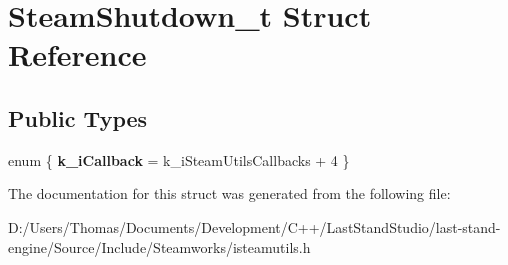 \hypertarget{structSteamShutdown__t}{}\section{Steam\+Shutdown\+\_\+t Struct Reference}
\label{structSteamShutdown__t}
\subsection*{Public Types}
\begin{DoxyCompactItemize}
\item 
\hypertarget{structSteamShutdown__t_abe17dbae8a47c87699f7d44c6ccc0898}{}enum \{ {\bfseries k\+\_\+i\+Callback} = k\+\_\+i\+Steam\+Utils\+Callbacks + 4
 \}\label{structSteamShutdown__t_abe17dbae8a47c87699f7d44c6ccc0898}

\end{DoxyCompactItemize}


The documentation for this struct was generated from the following file\+:\begin{DoxyCompactItemize}
\item 
D\+:/\+Users/\+Thomas/\+Documents/\+Development/\+C++/\+Last\+Stand\+Studio/last-\/stand-\/engine/\+Source/\+Include/\+Steamworks/isteamutils.\+h\end{DoxyCompactItemize}
